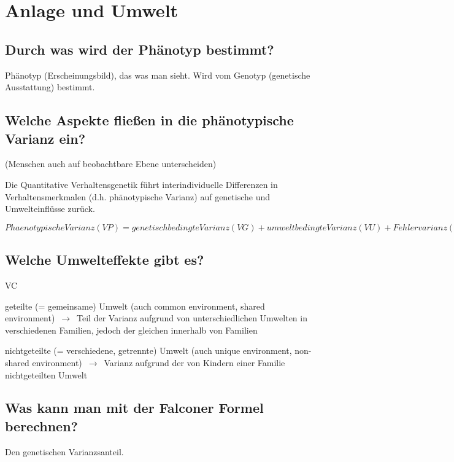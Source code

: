 \documentclass[a6paper,9pt,DIV=14]{scrartcl}
\begin{document}
\section{Anlage und Umwelt}
\subsection{Durch was wird der Phänotyp bestimmt?} %
Phänotyp (Erscheinungsbild), das was man sieht. Wird vom Genotyp (genetische Ausstattung) bestimmt.
\subsection{Welche Aspekte fließen in die phänotypische Varianz ein?} %
(Menschen auch auf beobachtbare Ebene unterscheiden)

Die Quantitative Verhaltensgenetik führt interindividuelle Differenzen in Verhaltensmerkmalen (d.h. phänotypische Varianz) auf genetische und Umwelteinflüsse zurück.

$Phaenotypische Varianz (VP) = genetisch bedingte Varianz (VG) + umweltbedingte Varianz (VU) + Fehlervarianz (VF)$

\subsection{Welche Umwelteffekte gibt es?} %
\begin{labeling}{VC}
\item [VC] geteilte (= gemeinsame) Umwelt (auch common environment, shared
environment) $\,\to\,$ Teil der Varianz aufgrund von unterschiedlichen Umwelten in
verschiedenen Familien, jedoch der gleichen innerhalb von Familien

\item [VE] nichtgeteilte (= verschiedene, getrennte) Umwelt (auch unique
environment, non-shared environment) $\,\to\,$ Varianz aufgrund der von Kindern
einer Familie nichtgeteilten Umwelt
\end{labeling}
\subsection{Was kann man mit der Falconer Formel berechnen?}
Den genetischen Varianzsanteil.
\end{document}
